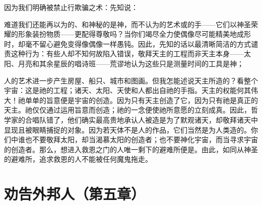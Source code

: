 \par

因为我们明确被禁止行欺骗之术：先知说：\par

难道我们还能再以为的、和神秘的是神，而不认为的艺术或的手——它们以神圣荣耀的形象装扮物质——更配得尊敬吗？当你们竭尽全力使偶像尽可能精美地成形时，却毫不留心避免变得像偶像一样愚钝。因此，先知的话以最清晰简洁的方式谴责这种行为：\newline{}有些人却不知何故陷入错误，敬拜天主的工程而非天主本身——太阳、月亮和其余星辰的唱诗班——荒谬地认为这些只是测量时间的工具是神；\par

人的艺术进一步产生房屋、船只、城市和图画。但我怎能述说天主所造的？看整个宇宙：这是祂的工程；诸天、太阳、天使和人都出自祂的手指。天主的权能何其伟大！祂单单的旨意便是宇宙的创造。因为只有天主创造了它，因为只有祂是真正的天主。祂仅仅通过运用旨意而创造；祂的一念便使祂所意愿的立刻成真。因此，哲学家的合唱队错了，他们确实最高贵地承认人被造是为了默观诸天，却敬拜诸天中显现且被眼睛捕捉的对象。因为若天体不是人的作品，它们当然是为人类造的。你们中谁也不要敬拜太阳，却当渴慕太阳的创造者；也不要神化宇宙，而当寻求宇宙的创造者。那么，想进入救恩之门的人唯一剩下的避难所便是。由此，如同从神圣的避难所，追求救恩的人不能被任何魔鬼拖走。\par



\section{劝告外邦人（第五章）}

